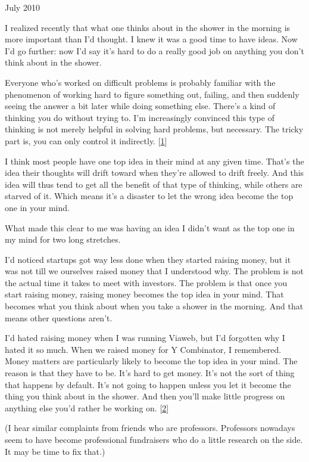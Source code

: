 July 2010

I realized recently that what one thinks about in the shower in the
morning is more important than I'd thought. I knew it was a good time to
have ideas. Now I'd go further: now I'd say it's hard to do a really
good job on anything you don't think about in the shower.

Everyone who's worked on difficult problems is probably familiar with
the phenomenon of working hard to figure something out, failing, and
then suddenly seeing the answer a bit later while doing something else.
There's a kind of thinking you do without trying to. I'm increasingly
convinced this type of thinking is not merely helpful in solving hard
problems, but necessary. The tricky part is, you can only control it
indirectly. {[}\hyperref[f1n]{1}{]}

I think most people have one top idea in their mind at any given time.
That's the idea their thoughts will drift toward when they're allowed to
drift freely. And this idea will thus tend to get all the benefit of
that type of thinking, while others are starved of it. Which means it's
a disaster to let the wrong idea become the top one in your mind.

What made this clear to me was having an idea I didn't want as the top
one in my mind for two long stretches.

I'd noticed startups got way less done when they started raising money,
but it was not till we ourselves raised money that I understood why. The
problem is not the actual time it takes to meet with investors. The
problem is that once you start raising money, raising money becomes the
top idea in your mind. That becomes what you think about when you take a
shower in the morning. And that means other questions aren't.

I'd hated raising money when I was running Viaweb, but I'd forgotten why
I hated it so much. When we raised money for Y Combinator, I remembered.
Money matters are particularly likely to become the top idea in your
mind. The reason is that they have to be. It's hard to get money. It's
not the sort of thing that happens by default. It's not going to happen
unless you let it become the thing you think about in the shower. And
then you'll make little progress on anything else you'd rather be
working on. {[}\hyperref[f2n]{2}{]}

(I hear similar complaints from friends who are professors. Professors
nowadays seem to have become professional fundraisers who do a little
research on the side. It may be time to fix that.)

